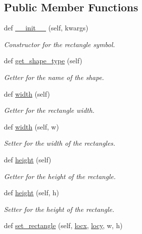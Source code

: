 \subsection*{Public Member Functions}
\begin{DoxyCompactItemize}
\item 
def \hyperlink{classbridges_1_1rectangle_1_1_rectangle_aad5cb2fdd1da2686fb67de2150f55d42}{\+\_\+\+\_\+init\+\_\+\+\_\+} (self, kwargs)
\begin{DoxyCompactList}\small\item\em Constructor for the rectangle symbol. \end{DoxyCompactList}\item 
def \hyperlink{classbridges_1_1rectangle_1_1_rectangle_ac6a82e131b0fc6f88ede4c9afb106b3a}{get\+\_\+shape\+\_\+type} (self)
\begin{DoxyCompactList}\small\item\em Getter for the name of the shape. \end{DoxyCompactList}\item 
def \hyperlink{classbridges_1_1rectangle_1_1_rectangle_a862f1154bb5e73c1811c38e7871f93a5}{width} (self)
\begin{DoxyCompactList}\small\item\em Getter for the rectangle width. \end{DoxyCompactList}\item 
def \hyperlink{classbridges_1_1rectangle_1_1_rectangle_a6b4b58e7312278fdc5d314bd574096bc}{width} (self, w)
\begin{DoxyCompactList}\small\item\em Setter for the width of the rectangles. \end{DoxyCompactList}\item 
def \hyperlink{classbridges_1_1rectangle_1_1_rectangle_a74a2af961f5eb512ccd5f7faded6645c}{height} (self)
\begin{DoxyCompactList}\small\item\em Getter for the height of the rectangle. \end{DoxyCompactList}\item 
def \hyperlink{classbridges_1_1rectangle_1_1_rectangle_ad150b377d0bc9f08c85f7f16643a6bf4}{height} (self, h)
\begin{DoxyCompactList}\small\item\em Setter for the height of the rectangle. \end{DoxyCompactList}\item 
def \hyperlink{classbridges_1_1rectangle_1_1_rectangle_a187376dcdc5c10c5b1ce5f3f00a80961}{set\+\_\+rectangle} (self, \hyperlink{classbridges_1_1rectangle_1_1_rectangle_adaf5da189e098dd7ff9875025723a4df}{locx}, \hyperlink{classbridges_1_1rectangle_1_1_rectangle_a85aebe3e2b5470bda5ad6c25d456111e}{locy}, w, h)

\end{DoxyCompactItemize}
